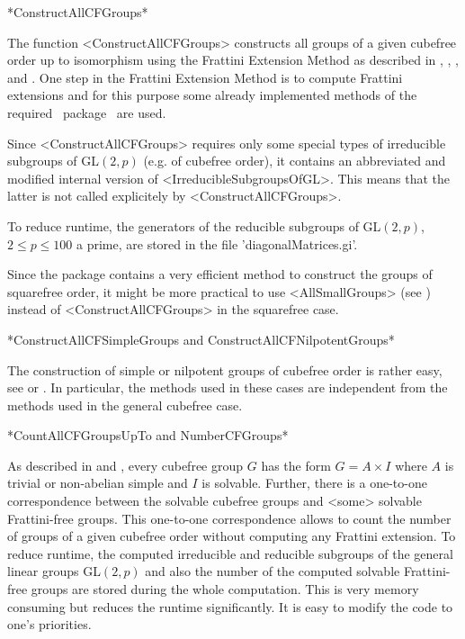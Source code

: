 *ConstructAllCFGroups*

The function <ConstructAllCFGroups> constructs all groups of a given
cubefree order up to isomorphism using the Frattini Extension Method as described in \cite{Di05},
  \cite{DiEi05}, \cite{BeEia}, and \cite{BeEib}. One step in the Frattini
  Extension Method is to compute Frattini extensions 
  and for this purpose some already implemented
methods of the required \GAP ~package \GrpConst ~are used. 

Since <ConstructAllCFGroups> requires only
some special types of irreducible subgroups of GL$(2,p)$ (e.g. of cubefree order), it
contains an abbreviated and modified internal version of
<IrreducibleSubgroupsOfGL>. This means that the latter is not called explicitely by
<ConstructAllCFGroups>.

To reduce runtime, the generators of the reducible subgroups of GL$(2,p)$,
$2\leq p \leq 100$ a prime, are stored in the file 'diagonalMatrices.gi'.

Since the {\GrpConst} package contains a very efficient method to construct the
groups of squarefree order, it might be more practical to use
<AllSmallGroups> (see \GrpConst) instead of <ConstructAllCFGroups> in the
squarefree case.

*ConstructAllCFSimpleGroups and ConstructAllCFNilpotentGroups*

The construction of simple or nilpotent groups of cubefree
order is rather easy, see \cite{Di05} or \cite{DiEi05}. In particular, the
methods used in these cases are independent from the methods used in the general cubefree case.



*CountAllCFGroupsUpTo and NumberCFGroups*

As described in \cite{Di05} and \cite{DiEi05}, every cubefree group $G$ has
the form $G=A\times I$ where $A$ is trivial or non-abelian simple and $I$ is
solvable. Further, there is a one-to-one correspondence between the solvable
cubefree groups and <some> solvable Frattini-free groups. This one-to-one
correspondence allows to count the number of groups of a given cubefree order without
computing any Frattini extension.
To reduce runtime, the
computed irreducible and reducible subgroups of the general linear groups
GL$(2,p)$ and also the number of the computed solvable
Frattini-free groups are stored during the whole computation. This is very
memory consuming but reduces the runtime significantly. It is easy to modify
the code to one's priorities.

